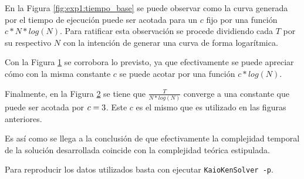	En la Figura \ref{fig:exp1:tiempo_base} se puede observar como la curva generada por el
	tiempo de ejecución puede ser acotada para un $c$ fijo por una función
	$c*N*log(N)$. Para ratificar esta observación se procede dividiendo cada $T$
	por su respectivo $N$ con la intención de generar una curva de forma
	logarítmica.

	\begin{figure}[H]
		\centering
		\caption{}
		\label{fig:tiempo_sobre_n}
	\end{figure}

	Con la Figura \ref{fig:tiempo_sobre_n} se corrobora lo previsto, ya que
	efectivamente se puede apreciar cómo con la misma constante $c$ se puede
	acotar por una función $c*log(N)$.

	\begin{figure}[H]
		\centering
		\caption{}
		\label{fig:tiempo_sobre_n_log_n}
	\end{figure}

	Finalmente, en la Figura \ref{fig:tiempo_sobre_n_log_n} se tiene que
	$\frac{T}{N*log(N)}$ converge a una constante que puede ser acotada por $c =
	3$. Este $c$ es el mismo que es utilizado en las figuras
	anteriores.

	Es así como se llega a la conclusión de que efectivamente la complejidad
	temporal de la solución desarrollada coincide con la complejidad teórica estipulada.

	Para reproducir los datos utilizados basta con ejecutar \texttt{KaioKenSolver
	-p}.
